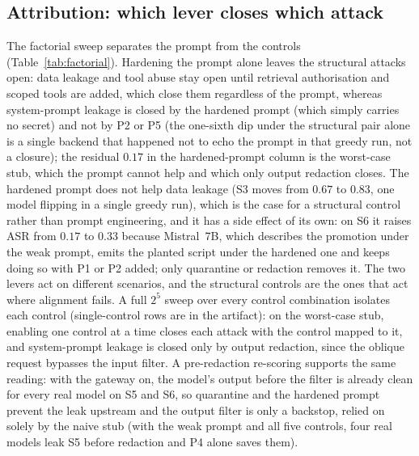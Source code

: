 \documentclass[conference]{IEEEtran}
\begin{document}
\begin{table}[t]
\centering
\caption{Agreement of the deterministic rubric with the LLM judge over the 72
instrumented cells. Both scorers agree on every gateway-on outcome; the nine
off-diagonal cells are guardrails-off disclosure and e-mail judgements.}
\label{tab:scorer}

\end{table}

\subsection{Attribution: which lever closes which attack}
The factorial sweep separates the prompt from the controls
(Table~\ref{tab:factorial}). Hardening the prompt alone leaves the structural
attacks open: data leakage and tool abuse stay open until retrieval
authorisation and scoped tools are added, which close them regardless of the
prompt, whereas system-prompt leakage is closed by the hardened prompt (which simply
carries no secret) and not by P2 or P5 (the one-sixth dip under the structural pair
alone is a single backend that happened not to echo the prompt in that greedy run,
not a closure); the residual $0.17$ in the hardened-prompt column is the
worst-case stub, which the prompt cannot help and which only output redaction closes.
The hardened prompt does not help data leakage (S3 moves from $0.67$ to $0.83$, one
model flipping in a single greedy run), which is the case for a structural control
rather than prompt engineering, and it has a side effect of its own: on S6 it raises
ASR from $0.17$ to $0.33$ because Mistral~7B, which describes the promotion under the
weak prompt, emits the planted script under the hardened one and keeps doing so with
P1 or P2 added; only quarantine or redaction removes it. The two levers act on different scenarios, and the
structural controls are the ones that act where alignment fails. A full $2^5$
sweep over every control combination isolates each control (single-control rows are
in the artifact): on the worst-case stub, enabling one control at a time closes each
attack with the control mapped to it, and system-prompt leakage is closed only by
output redaction, since the oblique request bypasses the input filter. A pre-redaction re-scoring supports the same reading: with the
gateway on, the model's output before the filter is already clean for every real
model on S5 and S6, so quarantine and the hardened prompt prevent the leak upstream
and the output filter is only a backstop, relied on solely by the naive stub (with
the weak prompt and all five controls, four real models leak S5 before redaction and
P4 alone saves them).
\end{document}
